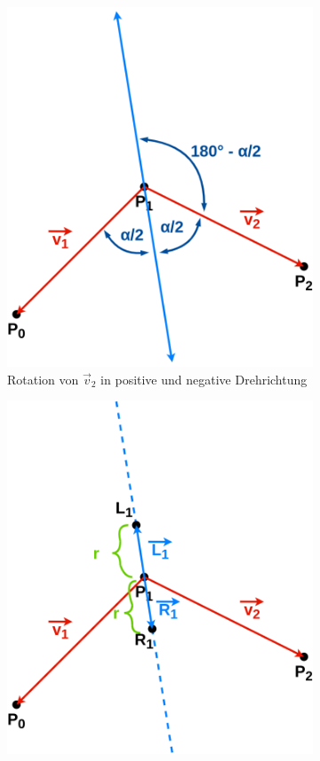 \documentclass[doktyp=studarbeit]{TUBAFarbeiten}
\begin{document}
\begin{figure}[!htb]
\begin{subfigure}[b]{0.35\textwidth}
        \includegraphics[width=1\linewidth]{Schlangenlinie-3.png}
        \caption{Rotation von $\vec{v}_{2}$ in positive und negative
        Drehrichtung}
    \end{subfigure}
    \qquad
    \begin{subfigure}[b]{0.35\textwidth}
        \centering
        \includegraphics[width=1\linewidth]{Schlangenlinie-4.png}

\end{subfigure}
\end{figure}
\end{document}

